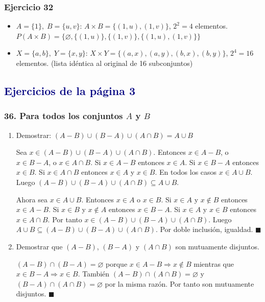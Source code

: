\documentclass[12pt,a4paper]{article}
\begin{document}
\subsubsection*{\textcolor{accent}{Ejercicio 32}}
\begin{itemize}
  \item[32.a] $A=\{1\},\;B=\{u,v\}$: $A\times B=\{(1,u),(1,v)\}$, $2^2=4$ elementos. $P(A\times B)=\{\varnothing,\{(1,u)\},\{(1,v)\},\{(1,u),(1,v)\}\}$
  \item[32.b] $X=\{a,b\},\;Y=\{x,y\}$: $X\times Y=\{(a,x),(a,y),(b,x),(b,y)\}$, $2^4=16$ elementos. (lista idéntica al original de 16 subconjuntos)
\end{itemize}

\subsection*{\textcolor{navy}{Ejercicios de la página 3}}

\subsubsection*{\textcolor{accent}{36. Para todos los conjuntos $A$ y $B$}}
\begin{enumerate}[label=\alph*)]
  \item Demostrar: $(A-B)\cup(B-A)\cup(A\cap B)=A\cup B$

  Sea $x\in(A-B)\cup(B-A)\cup(A\cap B)$. Entonces $x\in A-B$, o $x\in B-A$, o $x\in A\cap B$. Si $x\in A-B$ entonces $x\in A$. Si $x\in B-A$ entonces $x\in B$. Si $x\in A\cap B$ entonces $x\in A$ y $x\in B$. En todos los casos $x\in A\cup B$. Luego $(A-B)\cup(B-A)\cup(A\cap B)\subseteq A\cup B$.

  Ahora sea $x\in A\cup B$. Entonces $x\in A$ o $x\in B$. Si $x\in A$ y $x\notin B$ entonces $x\in A-B$. Si $x\in B$ y $x\notin A$ entonces $x\in B-A$. Si $x\in A$ y $x\in B$ entonces $x\in A\cap B$. Por tanto $x\in(A-B)\cup(B-A)\cup(A\cap B)$. Luego $A\cup B\subseteq(A-B)\cup(B-A)\cup(A\cap B)$. Por doble inclusión, igualdad. $\blacksquare$

  \item Demostrar que $(A-B)$, $(B-A)$ y $(A\cap B)$ son mutuamente disjuntos.

  $(A-B)\cap(B-A)=\varnothing$ porque $x\in A-B\Rightarrow x\notin B$ mientras que $x\in B-A\Rightarrow x\in B$. También $(A-B)\cap(A\cap B)=\varnothing$ y $(B-A)\cap(A\cap B)=\varnothing$ por la misma razón. Por tanto son mutuamente disjuntos. $\blacksquare$
\end{enumerate}
\end{document}
